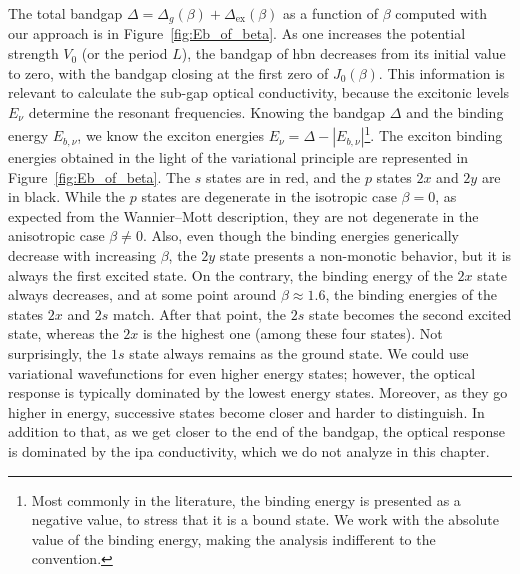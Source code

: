 The total bandgap $\Delta = \Delta_g(\beta) + \Delta_{\mathrm{ex}}(\beta)$ as a function of $\beta$ computed with our approach is in Figure~\ref{fig:Eb_of_beta}.
As one increases the potential strength $V_0$ (or the period $L$), the bandgap of \gls{hbn} decreases from its initial value to zero, with the bandgap closing at the first zero of $J_0(\beta)$.
This information is relevant to calculate the sub-gap optical conductivity, because the excitonic levels $E_{\nu}$ determine the resonant frequencies.
Knowing the bandgap $\Delta$ and the binding energy $E_{b,\nu}$, we know the exciton energies $E_\nu = \Delta - |E_{b,\nu}|$\footnote{Most commonly in the literature, the binding energy is presented as a negative value, to stress that it is a bound state. We work with the absolute value of the binding energy, making the analysis indifferent to the convention.}.
The exciton binding energies obtained in the light of the variational principle are represented in Figure~\ref{fig:Eb_of_beta}.
The $s$ states are in red, and the $p$ states $2x$ and $2y$ are in black.
While the $p$ states are degenerate in the isotropic case $\beta=0$, as expected from the Wannier--Mott description, they are not degenerate in the anisotropic case $\beta \neq 0$.
Also, even though the binding energies generically decrease with increasing $\beta$, the $2y$ state presents a non-monotic behavior, but it is always the first excited state.
On the contrary, the binding energy of the $2x$ state always decreases, and at some point around $\beta \approx 1.6$, the binding energies of the states $2x$ and $2s$ match.
After that point, the $2s$ state becomes the second excited state, whereas the $2x$ is the highest one (among these four states).
Not surprisingly, the $1s$ state always remains as the ground state.
We could use variational wavefunctions for even higher energy states; however, the optical response is typically dominated by the lowest energy states.
Moreover, as they go higher in energy, successive states become closer and harder to distinguish.
In addition to that, as we get closer to the end of the bandgap, the optical response is dominated by the \gls{ipa} conductivity, which we do not analyze in this chapter.


